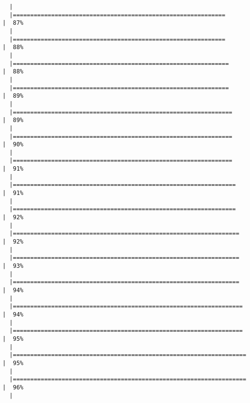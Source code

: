 \documentclass[12pt]{article}
\begin{document}
\begin{verbatim}
  |                                                                            
  |=============================================================         |  87%
  |                                                                            
  |=============================================================         |  88%
  |                                                                            
  |==============================================================        |  88%
  |                                                                            
  |==============================================================        |  89%
  |                                                                            
  |===============================================================       |  89%
  |                                                                            
  |===============================================================       |  90%
  |                                                                            
  |===============================================================       |  91%
  |                                                                            
  |================================================================      |  91%
  |                                                                            
  |================================================================      |  92%
  |                                                                            
  |=================================================================     |  92%
  |                                                                            
  |=================================================================     |  93%
  |                                                                            
  |=================================================================     |  94%
  |                                                                            
  |==================================================================    |  94%
  |                                                                            
  |==================================================================    |  95%
  |                                                                            
  |===================================================================   |  95%
  |                                                                            
  |===================================================================   |  96%
  |                                                                            

\end{verbatim}
\end{document}
